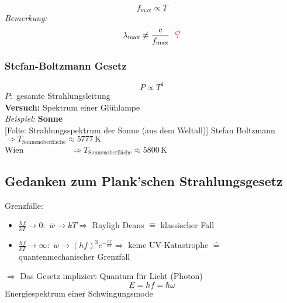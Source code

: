 \documentclass[titlepage,11pt,a4paper,ngerman]{report}
\newcommand{\tx}[1]{\textrm{#1}}
\newcommand{\ol}[1]{\overline{#1}}
\newcommand{\folie}[1]{\color{gray}[Folie: #1]\color{black}}
\newcommand{\versuch}[1]{\color{red!50!black} \textbf{Versuch:} \color{black} #1\\ }
\newcommand{\mau}{$\buildrel \mathcal{O} \over{\textbf{.}}$}
\begin{document}
$$ f_{\tx{max}} \propto T $$
\emph{Bemerkung:}
\begin{equation*}
\lambda_{\tx{max}} \neq \frac{c}{f_{\tx{max}}} \ \ \color{red} \tx{\mau} \color{black}
\end{equation*}

\subsubsection{Stefan-Boltzmann Gesetz}

$$ P \propto T^4 $$
$ P : $ gesamte Strahlungsleitung\\[10pt]
\versuch{Spektrum einer Glühlampe}
\emph{Beispiel:} \textbf{Sonne}\\[5pt]
\folie{Strahlungsspektrum der Sonne (aus dem Weltall)}
Stefan Boltzmann $ \Rightarrow T_{\tx{Sonnenoberfläche}} \approx 5777 \, \tx{K} $\\
Wien $ \quad \ \: \qquad \qquad \Rightarrow T_{\tx{Sonnenoberfläche}} \approx 5800 \, \tx{K} $

\subsection{Gedanken zum Plank'schen Strahlungsgesetz}

Grenzfälle:
\begin{itemize}
	\item $ \frac{hf}{kT} \to 0 : $ $ \ol{w} \to kT \Rightarrow $ Rayligh Deans $ \widehat{=} $ klassischer Fall
	\item $ \frac{hf}{kT} \to \infty : $ $ \ol{w} \to (hf)^3 e^{-\frac{hf}{kT}} \Rightarrow $ keine UV-Katastrophe $ \widehat{=} $ quantenmechanischer Grenzfall
\end{itemize}
$ \Rightarrow $ Das Gesetz impliziert Quantum für Licht (Photon)
\begin{equation*}
E = hf = \hbar \omega
\end{equation*}
Energiespektrum einer Schwingungsmode

\end{document}
